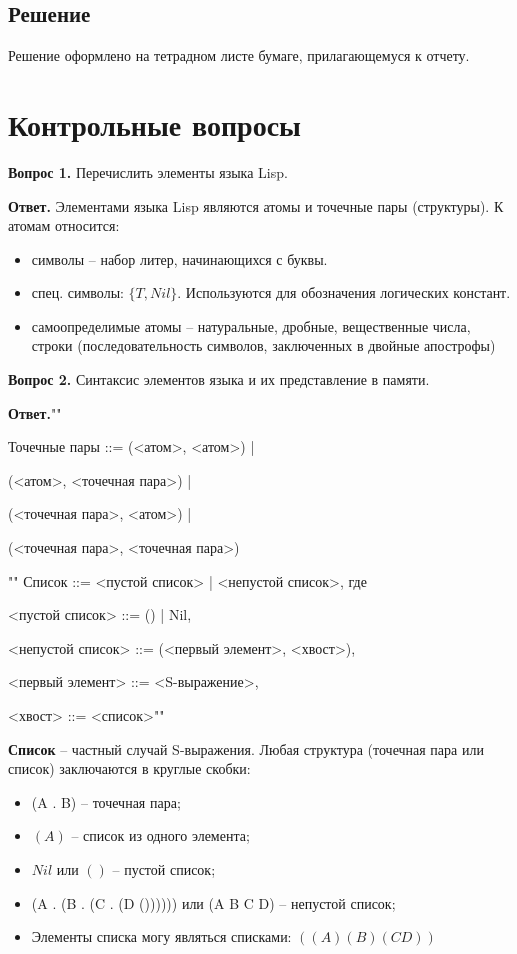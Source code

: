 \documentclass[12pt]{report}
\begin{document}
	\section*{Решение}
	Решение оформлено на тетрадном листе бумаге, прилагающемуся к отчету.
	
	\chapter*{Контрольные вопросы}
	\textbf{Вопрос 1.} Перечислить элементы языка Lisp.
	
	\textbf{Ответ.} Элементами языка Lisp являются атомы и точечные пары (структуры). К атомам относится:
	
	\begin{itemize}
		\item символы -- набор литер, начинающихся с буквы.
		\item спец. символы: $\{T, Nil\}$. Используются для обозначения логических констант.
		\item самоопределимые атомы -- натуральные, дробные, вещественные числа, строки (последовательность символов, заключенных в двойные апострофы)
	\end{itemize}
	
	\textbf{Вопрос 2.} Синтаксис элементов языка и их представление в памяти.
	
	\textbf{Ответ.}""\newline
	
	Точечные пары ::= (<атом>, <атом>) |
	
	(<атом>, <точечная пара>) |
	
	(<точечная пара>, <атом>) |
	
	(<точечная пара>, <точечная пара>)
	
	
	""\newline
	\indent Список ::= <пустой список> | <непустой список>, где
	
	<пустой список> ::= () | Nil,
	
	<непустой список> ::= (<первый элемент>, <хвост>),
	
	<первый элемент> ::= <S-выражение>,
	
	<хвост> ::= <список>""\newline
	
	\indent \textbf{Список} -- частный случай S-выражения. Любая структура (точечная пара или список) заключаются в круглые скобки:
	
	\begin{itemize}
		\item (A . B) -- точечная пара;
		\item $(A)$ -- список из одного элемента;
		\item $Nil$ или $()$ -- пустой список;
		\item (A . (B . (C . (D ()))))) или (A B C D) -- непустой список;
		\item Элементы списка могу являться списками: $((A)(B)(CD))$
	\end{itemize}
	
\end{document}
